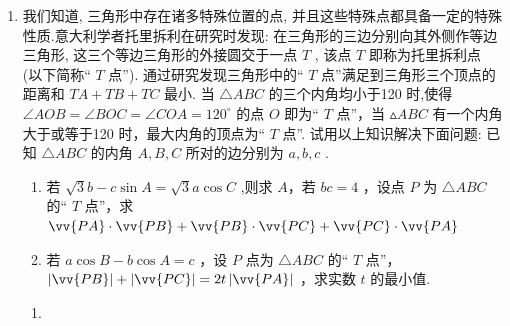 \begin{enumerate}
\begin{enumerate}
\begin{jieda}
            由 $\left| {PA}\right|  \cdot  \left| {PB}\right|  + \left| {PB}\right|  \cdot  \left| {PC}\right|  + \left| {PA}\right|  \cdot  \left| {PC}\right|  = 8$ ,等号左右两边同时乘以 $\cos \dfrac{2\pi }{3}$ 可得:
            
            $\left| {PA}\right|  \cdot  \left| {PB}\right| \cos \dfrac{2\pi }{3} + \left| {PB}\right|  \cdot  \left| {PC}\right| \cos \dfrac{2\pi }{3} + \left| {PA}\right|  \cdot  \left| {PC}\right| \cos \dfrac{2\pi }{3} = 8 \times  \cos \dfrac{2\pi }{3}$ ,
            
            则 $\vv{PA} \cdot  \vv{PB} + \vv{PB} \cdot  \vv{PC} + \vv{PA} \cdot  \vv{PC} = 8 \times  \cos \dfrac{2\pi }{3} =  - 4$ .
        \end{jieda}
        \item 我们知道, 三角形中存在诸多特殊位置的点, 并且这些特殊点都具备一定的特殊性质.意大利学者托里拆利在研究时发现: 在三角形的三边分别向其外侧作等边三角形, 这三个等边三角形的外接圆交于一点 $T$ , 该点 $T$ 即称为托里拆利点 (以下简称“ $T$ 点”). 通过研究发现三角形中的“ $T$ 点”满足到三角形三个顶点的距离和 ${TA} + {TB} + {TC}$ 最小. 当 $\bigtriangleup  {ABC}$ 的三个内角均小于120 \textdegree 时,使得 $\angle {AOB} = \angle {BOC} = \angle {COA} = {120}^{ \circ  }$ 的点 $O$ 即为“ $T$ 点”，当 $\vartriangle  {ABC}$ 有一个内角大于或等于120 \textdegree 时，最大内角的顶点为“ $T$ 点”. 试用以上知识解决下面问题: 已知 $\bigtriangleup  {ABC}$ 的内角 $A,B,C$ 所对的边分别为 $a,b,c$ .
        \begin{enumerate}
            \item 若 $\sqrt{3}b - c\sin A = \sqrt{3}a\cos C$ ,则求 $A$，若 ${bc} = 4$ ，设点 $P$ 为 $\bigtriangleup  {ABC}$ 的“ $T$ 点”，求 $\vv{PA} \cdot  \vv{PB} + \vv{PB} \cdot  \vv{PC} + \vv{PC} \cdot  \vv{PA}$
            \item 若 $a\cos B - b\cos A = c$ ，设 $P$ 点为 $\bigtriangleup  {ABC}$ 的“ $T$ 点”， $\left| \vv{PB}\right|  + \left| \vv{PC}\right|  = {2t}\left| \vv{PA}\right|$ ，求实数 $t$ 的最小值.
        \end{enumerate}
        \begin{jieda}
            \begin{enumerate}
                \item {}
\end{enumerate}
\end{jieda}
\end{enumerate}
\end{enumerate}
